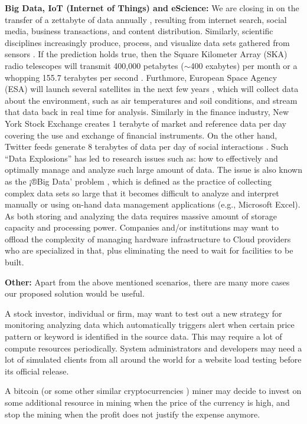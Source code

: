\documentclass[journal]{IEEEtran}
\begin{document}
\textbf{Big Data, IoT (Internet of Things) and eScience:} We are closing in on the transfer of a zettabyte of data annually \cite{ref11}, resulting from internet search, social media, business transactions, and content distribution. Similarly, scientific disciplines increasingly produce, process, and visualize data sets gathered from sensors \cite{GHadoop}. If the prediction holds true, then the Square Kilometer Array (SKA) radio telescopes will transmit 400,000 petabytes ($\sim$400 exabytes) per month or a whopping 155.7 terabytes per second \cite{ref12}. Furthmore, European Space Agency (ESA) will launch several satellites in the next few years \cite{ref13}, which will collect data about the environment, such as air temperatures and soil conditions, and stream that data back in real time for analysis.  Similarly in the finance industry, New York Stock Exchange creates 1 terabyte of market and reference data per day covering the use and exchange of financial instruments. On the other hand, Twitter feeds generate 8 terabytes of data per day of social interactions \cite{ref14}. Such ``Data Explosions'' has led to research issues such as: how to effectively and optimally manage and analyze such large amount of data. The issue is also known as the ¡®Big Data' problem    \cite{hey2003data}, which is defined as the practice of collecting complex data sets so large that it becomes difficult to analyze and interpret manually or using on-hand data management applications (e.g., Microsoft Excel). As both storing and analyzing the data requires massive amount of storage capacity and processing power. Companies and/or institutions may want to offload the complexity of managing hardware infrastructure to Cloud providers who are specialized in that, plus eliminating the need to wait for facilities to be built.

\textbf{Other:} Apart from the above mentioned scenarios, there are many more cases our proposed solution would be useful.


A stock investor, individual or firm, may want to test out a new strategy for monitoring analyzing data which automatically triggers alert when certain price pattern or keyword is identified in the source data. This may require a lot of compute resources periodically.
System administrators and developers may need a lot of simulated clients from all around the world for a website load testing before its official release.


A bitcoin    \cite{bedford2013bitcoin} (or some other similar cryptocurrencies \cite{ref17}) miner may decide to invest on some additional resource in mining when the price of the currency is high, and stop the mining when the profit does not justify the expense anymore.
\end{document}
